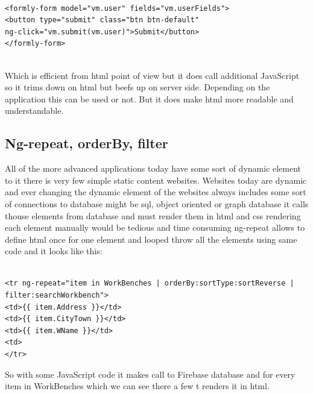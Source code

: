 \begin{verbatim}

<formly-form model="vm.user" fields="vm.userFields">
<button type="submit" class="btn btn-default" 
ng-click="vm.submit(vm.user)">Submit</button>
</formly-form>


\end{verbatim}
\bigbreak

Which is efficient from html point of view but it does call additional JavaScript so it trims down on html but beefs up on server side. Depending on the application this can be used or not. But it does make html more readable and understandable.




\subsection{Ng-repeat, orderBy, filter}
\bigbreak

All of the more advanced applications today have some sort of dynamic element to it there is very few simple static content websites. Websites today are dynamic and ever changing the dynamic element of the websites always includes some sort of connections to database might be sql, object oriented or graph database it calls thouse elements from database and must render them in html and css rendering each element manually would be tedious and time consuming ng-repeat allows to define html once for one element and looped throw all the elements using same code and it looks like this:
\bigbreak

\begin{verbatim}

<tr ng-repeat="item in WorkBenches | orderBy:sortType:sortReverse | filter:searchWorkbench">
<td>{{ item.Address }}</td>
<td>{{ item.CityTown }}</td>
<td>{{ item.WName }}</td>
<td>
</tr>

\end{verbatim}
\bigbreak

So with some JavaScript code it makes call	to Firebase database and for every item in WorkBenches which we can see there a few t renders it in html.
\bigbreak

